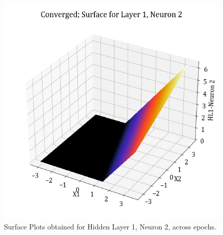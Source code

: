 \documentclass[11pt,a4paper]{article}
\begin{document}
\begin{figure}[H]
    \includegraphics[scale=0.4]{images/1B_MLFFNN_conv_HL1_N2.png}
    \caption{Surface Plots obtained for Hidden Layer 1, Neuron 2, across epochs.}
\end{figure}
\end{document}
